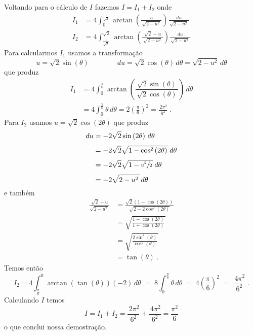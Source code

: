 Voltando para o cálculo de $I$ fazemos $I=I_1+I_2$ onde
\begin{align*}
  I_1 & = 4 \int_{0}^{\frac{1}{\sqrt{2}}}
  \arctan\left(\frac{u}{\,\sqrt{2-u^2}\,}\right)
  \frac{du}{\,\sqrt{2-u^2}\,}
  \\[3mm]
  I_2 & = 4 \int_{\frac{1}{\sqrt{2}}}^{\sqrt{2}}
  \arctan\left(\frac{\sqrt{2}-u}{\,\sqrt{2-u^2}\,}\right)
  \frac{du}{\,\sqrt{2-u^2}\,}
\end{align*}
Para calcularmos $I_1$ usamos a transformação
\[
u = \sqrt{2} \sin\left(\theta\right)
\qquad\qquad
du = \sqrt{2} \cos\left(\theta\right) \,d\theta
= \sqrt{2-u^2}\,d\theta
\]
que produz
\begin{align*}
  I_1 & = 4 \int_{0}^{\frac{\pi}{6}}
  \arctan\left(\dfrac{  \sqrt{2} \sin\left(\theta\right)}
  {\,\sqrt{2} \cos\left(\theta\right)\,}\right)
  \,d\theta
  \\[3mm]
  & = 4 \int_{0}^{\frac{\pi}{6}} \theta \,d\theta
  = 2 \left(\frac{\pi}{6}\right)^2
  = \frac{\,2 \pi^2}{6^2}    \;.
\end{align*}
Para $I_2$ usamos \(u = \sqrt{2} \cos\left(2\theta\right)\) que produz
\begin{align*}
  du & = -2\sqrt{2} \sin\left(2\theta\right)                \,d\theta \\[1mm]
  & = -2\sqrt{2} \sqrt{1 - \cos^2\left(2\theta\right)\,} \,d\theta \\[1mm]
  & = -2\sqrt{2} \sqrt{1 - \sfrac{u^2}{2}\,}             \,d\theta \\[1mm]
  & = -2\sqrt{2 - u^2\,}                                 \,d\theta
\end{align*}
e também
\begin{align*}
  \frac{\sqrt{2}-u}{\sqrt{2-u^2\,}}
  & = \frac{\sqrt{2}(1-\cos(2\theta))}{\sqrt{2 - 2\cos^2(2\theta)}} \\[3mm]
  & = \sqrt{\frac{1-\cos(2\theta)}{1 + \cos(2\theta)}\,}            \\[3mm]
  & = \sqrt{\frac{2\sin^2(\theta)}{\cos^2(\theta)}\,}               \\[3mm]
  & = \tan(\theta)  \;.
\end{align*}
Temos então
\[
I_2   =   4 \int_{\frac{\pi}{6}}^{0} \arctan\left(\tan(\theta)\right) (-2)\,d\theta
\;=\; 8 \int_{0}^{\frac{\pi}{6}} \theta \,d\theta
\;=\; 4 \left(\frac{\pi}{6}\right)^2
\;=\; \frac{\,4 \pi^2}{6^2}  \;.
\]
Calculando $I$ temos
\[
I = I_1 + I_2
= \frac{\,2 \pi^2}{6^2}
+ \frac{\,4 \pi^2}{6^2}
= \frac{\pi^2}{6}
\]
o que conclui nossa demostração.


